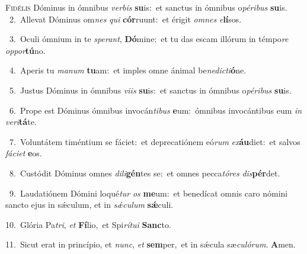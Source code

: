 \lettrine{\initial\textcolor{\initialcolor}{F}}{idélis} Dóminus in ómnibus \textit{ver}\-\textit{bis} \textbf{su}\-is:~\star et sanctus in ómnibus o\-\textit{pé}\-\textit{ri}\textit{bus} \textbf{su}\-is.\\
{\numbfont\textcolor{\numbcolor}{~2.}}~Allevat Dóminus om\textit{nes} \textit{qui} \textbf{cór}\-ruunt:~\star et érigit \textit{om}\-\textit{nes} \textit{e}\-\textbf{lí}sos.\par
{\numbfont\textcolor{\numbcolor}{~3.}}~Oculi ómnium in te \textit{spe}\-\textit{rant}, \textbf{Dó}\-mine:~\star et tu das escam illórum in témpo\textit{re} \textit{op}\-\textit{por}\textbf{tú}no.\par
{\numbfont\textcolor{\numbcolor}{~4.}}~Aperis tu \textit{ma}\-\textit{num} \textbf{tu}\-am:~\star et imples omne ánimal be\-\textit{ne}\-\textit{dic}\textit{ti}\textbf{ó}ne.\par
{\numbfont\textcolor{\numbcolor}{~5.}}~Justus Dóminus in ómnibus \textit{vi}\-\textit{is} \textbf{su}\-is:~\star et sanctus in ómnibus o\-\textit{pé}\-\textit{ri}\textit{bus} \textbf{su}\-is.\par
{\numbfont\textcolor{\numbcolor}{~6.}}~Prope est Dóminus ómnibus invocán\-\textit{ti}\-\textit{bus} \textbf{e}\-um:~\star ómnibus invocántibus eum \textit{in} \textit{ve}\-\textit{ri}\textbf{tá}te.\par
{\numbfont\textcolor{\numbcolor}{~7.}}~Voluntátem timéntium se fáciet:~\dagger et deprecatiónem eó\textit{rum} \textit{ex}\-\textbf{áu}diet:~\star et salvos \textit{fá}\-\textit{ci}\textit{et} \textbf{e}\-os.\par
{\numbfont\textcolor{\numbcolor}{~8.}}~Custódit Dóminus omnes \textit{di}\-\textit{li}\textbf{gén}tes se:~\star et omnes pecca\-\textit{tó}\-\textit{res} \textit{dis}\-\textbf{pér}det.\par
{\numbfont\textcolor{\numbcolor}{~9.}}~Laudatiónem Dómini loqué\textit{tur} \textit{os} \textbf{me}\-um:~\star et benedícat omnis caro nómini sancto ejus in sǽculum, et in \textit{sǽ}\-\textit{cu}\textit{lum} \textbf{sǽ}\-culi.\par
{\numbfont\textcolor{\numbcolor}{10.}}~Glória Pa\-\textit{tri}\-, \textit{et} \textbf{Fí}\-lio,~\star et Spi\-\textit{rí}\-\textit{tu}\textit{i} \textbf{Sanc}\-to.\par
{\numbfont\textcolor{\numbcolor}{11.}}~Sicut erat in princípio, et \textit{nunc}\-, \textit{et} \textbf{sem}\-per,~\star et in sǽcula sæ\-\textit{cu}\-\textit{ló}\textit{rum}. \textbf{A}\-men.\par
